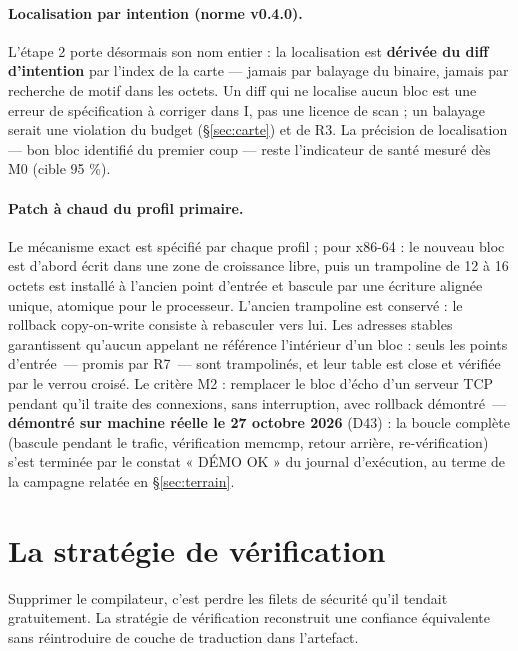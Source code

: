 \paragraph{Localisation par intention (norme v0.4.0).} L’étape 2 porte désormais son nom
entier : la localisation est \textbf{dérivée du diff d’intention} par l’index de la carte
— jamais par balayage du binaire, jamais par recherche de motif dans les octets. Un diff
qui ne localise aucun bloc est une erreur de spécification à corriger dans I, pas une
licence de scan ; un balayage serait une violation du budget (§\ref{sec:carte}) et de R3.
La précision de localisation — bon bloc identifié du premier coup — reste l’indicateur de
santé mesuré dès M0 (cible 95 \%).

\paragraph{Patch à chaud du profil primaire.} Le mécanisme exact est spécifié par chaque
profil ; pour x86-64 : le nouveau bloc est d’abord écrit dans une zone de croissance
libre, puis un trampoline de 12 à 16 octets est installé à l’ancien point d’entrée et
bascule par une écriture alignée unique, atomique pour le processeur. L’ancien trampoline
est conservé : le rollback copy-on-write consiste à rebasculer vers lui. Les adresses
stables garantissent qu’aucun appelant ne référence l’intérieur d’un bloc : seuls les
points d’entrée~— promis par R7~— sont trampolinés, et leur table est close et vérifiée
par le verrou croisé. Le critère M2 : remplacer le bloc d’écho d’un serveur TCP pendant
qu’il traite des connexions, sans interruption, avec rollback démontré~— \textbf{démontré
sur machine réelle le 27 octobre 2026} (D43) : la boucle complète (bascule pendant le
trafic, vérification memcmp, retour arrière, re-vérification) s’est terminée par le
constat « DÉMO OK » du journal d’exécution, au terme de la campagne relatée en
§\ref{sec:terrain}.

\section{La stratégie de vérification}\label{sec:verification}

Supprimer le compilateur, c’est perdre les filets de sécurité qu’il tendait gratuitement.
La stratégie de vérification reconstruit une confiance équivalente sans réintroduire de
couche de traduction dans l’artefact.

